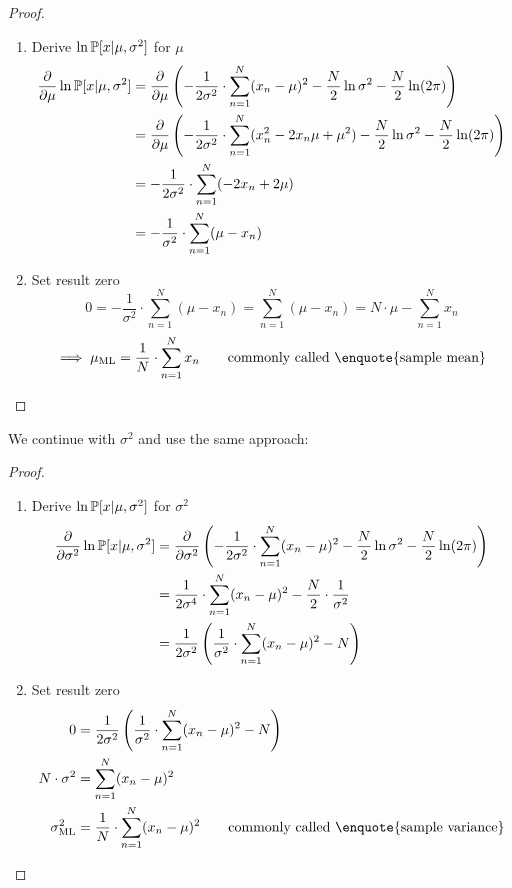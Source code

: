 \begin{proof}
\begin{enumerate}
  \item Derive $\ln{\mathbb P[x| \mu, \sigma^2]}$ for $\mu$
    \begin{align*}
      \frac\partial{\partial \mu} \ln{\mathbb P[x | \mu, \sigma^2]}
      &= \frac\partial{\partial \mu} \left(-\frac{1}{2\sigma^2} \cdot \sum_{n=1}^N (x_n - \mu)^2 - \frac{N}{2} \ln{\sigma^2} - \frac{N}{2} \ln(2\pi)\right) \\
      &= \frac\partial{\partial \mu} \left(-\frac{1}{2\sigma^2} \cdot \sum_{n=1}^N (x_n^2 - 2 x_n \mu + \mu^2) - \frac{N}{2} \ln{\sigma^2} - \frac{N}{2} \ln(2\pi)\right) \\
      &= -\frac{1}{2\sigma^2} \cdot \sum_{n=1}^N (-2x_n + 2\mu) \\
      &= -\frac1{\sigma^2} \cdot \sum_{n=1}^N (\mu - x_n)
    \end{align*}
  \item Set result zero
    \[ 0 = -\frac{1}{\sigma^2} \cdot \sum_{n=1}^N (\mu - x_n) = \sum_{n=1}^N (\mu - x_n) = N \cdot \mu - \sum_{n=1}^N x_n \]
    \[ \implies \mu_{\text{ML}} = \frac1N \cdot \sum_{n=1}^N x_n \qquad \text{commonly called \enquote{sample mean}} \]
\end{enumerate}
\end{proof}

We continue with $\sigma^2$ and use the same approach:

\begin{proof}
  \begin{enumerate}
  \item Derive $\ln{\mathbb P[x | \mu, \sigma^2]}$ for $\sigma^2$
    \begin{align*}
      \frac{\partial}{\partial \sigma^2} \ln{\mathbb P[x | \mu, \sigma^2]}
      &= \frac{\partial}{\partial \sigma^2} \left(-\frac{1}{2\sigma^2} \cdot \sum_{n=1}^N (x_n - \mu)^2 - \frac{N}2 \ln{\sigma^2} - \frac{N}2 \ln(2\pi)\right) \\
      &= \frac{1}{2\sigma^4} \cdot \sum_{n=1}^N (x_n - \mu)^2 - \frac{N}{2} \cdot \frac{1}{\sigma^2} \\
      &= \frac{1}{2\sigma^2} \left(\frac{1}{\sigma^2} \cdot \sum_{n=1}^N (x_n - \mu)^2 - N\right)
    \end{align*}
  \item Set result zero
    \begin{align*}
      0 &= \frac{1}{2\sigma^2} \left(\frac{1}{\sigma^2} \cdot \sum_{n=1}^N (x_n - \mu)^2 - N\right) \\
      N \cdot \sigma^2 &= \sum_{n=1}^N (x_n - \mu)^2 \\
      \sigma^2_{\text{ML}} &= \frac{1}{N} \cdot \sum_{n=1}^N (x_n - \mu)^2 \qquad \text{commonly called \enquote{sample variance}}
    \end{align*}
  \end{enumerate}
\end{proof}

